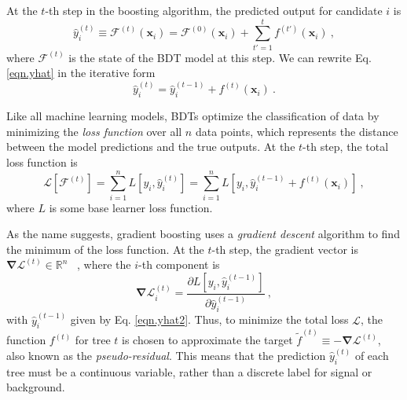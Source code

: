 At the $t$-th step in the boosting algorithm, the predicted output for candidate $i$ is \cite{friedman}
\begin{equation}
    \hat{y}_i^{(t)} \equiv \mathcal{F}^{(t)}(\mathbf{x}_i) = \mathcal{F}^{(0)}(\mathbf{x}_i) + \sum_{t'=1}^t f^{(t')}(\mathbf{x}_i) \ ,
    \label{eqn.yhat}
\end{equation}
where $\mathcal{F}^{(t)}$ is the state of the BDT model at this step.  We can rewrite Eq. \eqref{eqn.yhat} in the iterative form
\begin{equation}
    \hat{y}^{(t)}_i = \hat{y}^{(t-1)}_i + f^{(t)}(\mathbf{x}_i) \ .
    \label{eqn.yhat2}
\end{equation}

Like all machine learning models, BDTs optimize the classification of data by minimizing the {\it loss function} over all $n$ data points, which represents the distance between the model predictions and the true outputs. At the $t$-th step, the total loss function is \cite{friedman}
\begin{equation}
    \mathcal{L}[\mathcal{F}^{(t)}] = \sum_{i=1}^n L \left[y_i, \hat{y}^{(t)}_i \right] = \sum_{i=1}^n L \left[y_i, \hat{y}^{(t-1)}_i+f^{(t)}(\mathbf{x}_i) \right] \ ,
\end{equation}
where $L$ is some base learner loss function.

As the name suggests, gradient boosting uses a {\it gradient descent} algorithm to find the minimum of the loss function. At the $t$-th step, the gradient vector is $\mathbf{\nabla}\mathcal{L}^{(t)} \in \mathbb{R}^n$ \ , where the $i$-th component is
\begin{equation}
    \mathbf{\nabla}\mathcal{L}_i^{(t)} = \frac{\partial L[y_i, \hat{y}^{(t-1)}_i ]}{\partial \hat{y}^{(t-1)}_i} \ ,
\end{equation}
with $\hat{y}^{(t-1)}_i$ given by Eq. \eqref{eqn.yhat2}. Thus, to minimize the total loss $\mathcal{L}$, the function $f^{(t)}$ for tree $t$ is chosen to approximate the target $\tilde{f}^{(t)} \equiv -\mathbf{\nabla}\mathcal{L}^{(t)}$, also known as the {\it pseudo-residual}. This means that the prediction $\hat{y}^{(t)}_i$ of each tree must be a continuous variable, rather than a discrete label for signal or background.

